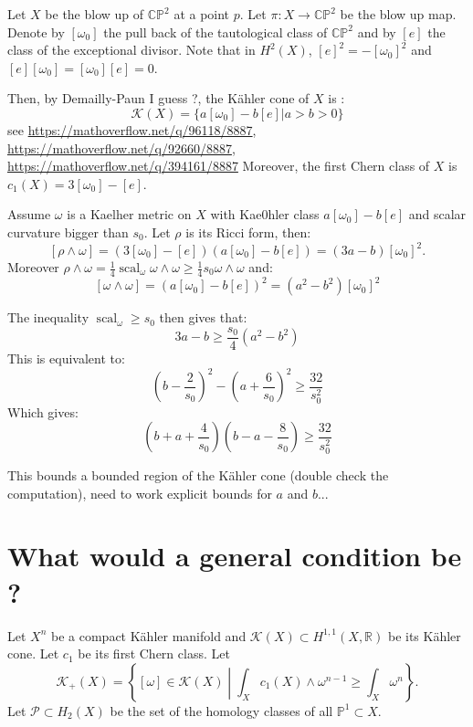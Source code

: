 \documentclass{amsart}
\numberwithin{equation}{section}
\theoremstyle{definition}
\DeclareMathOperator{\scal}{scal}
\begin{document}
Let $X$ be the blow up of $\mathbb{CP}^2$ at a point $p$. Let $\pi:X\to\mathbb{CP}^2$ be the blow up map. Denote by $[\omega_0]$ the pull back of the tautological class of $\mathbb{CP}^2$ and by $[e]$ the class of the exceptional divisor. Note that in $H^2(X)$, $[e]^2=-[\omega_0]^2$ and $[e][\omega_0]=[\omega_0][e]=0$.

Then, by Demailly-Paun I guess ?, the K\"ahler cone of $X$ is :
\[\mathcal{K}(X)=\{a[\omega_0]-b[e]|a>b>0\}\]
see \url{https://mathoverflow.net/q/96118/8887}, \url{https://mathoverflow.net/q/92660/8887}, \url{https://mathoverflow.net/q/394161/8887}
Moreover, the first Chern class of $X$ is $c_1(X)=3[\omega_0]-[e]$.

Assume $\omega$ is a Kaelher metric on $X$ with Kae0hler class $a[\omega_0]-b[e]$ and scalar curvature bigger than $s_0$. Let $\rho$ is its Ricci form, then:
\[[\rho\wedge\omega]=(3[\omega_0]-[e])(a[\omega_0]-b[e])=(3a-b)[\omega_0]^2.\]
Moreover $\rho\wedge\omega=\tfrac{1}{4}\scal_\omega \omega\wedge\omega\geq\tfrac{1}{4} s_0\omega\wedge\omega$ and:
\[[\omega\wedge\omega]=(a[\omega_0]-b[e])^2=(a^2-b^2)[\omega_0]^2\]

The inequality $\scal_\omega\geq s_0$ then gives that:
\[3a-b\geq \frac{s_0}{4}(a^2-b^2)\]
This is equivalent to:
\[\left(b-\frac{2}{s_0}\right)^2-\left(a+\frac{6}{s_0}\right)^2\geq \frac{32}{s_0^2}\]
Which gives:
\[\left(b+a+\frac{4}{s_0}\right)\left(b-a-\frac{8}{s_0}\right)\geq\frac{32}{s_0^2} \]

This bounds a bounded region of the K\"ahler cone (double check the computation), need to work explicit bounds for $a$ and $b$...

\section{What would a general condition be ?}

Let $X^n$ be a compact K\"ahler manifold and $\mathcal{K}(X)\subset H^{1,1}(X,\mathbb{R})$ be its K\"ahler cone. Let $c_1$ be its first Chern class. Let \[\mathcal{K}_+(X)=\left\{[\omega]\in\mathcal{K}(X)\middle|\int_X c_1(X)\wedge \omega^{n-1}\geq \int_X\omega^n\right\}.\]
Let $\mathcal{P}\subset H_2(X)$ be the set of the homology classes of  all $\mathbb{P}^1 \subset X$.
\end{document}

